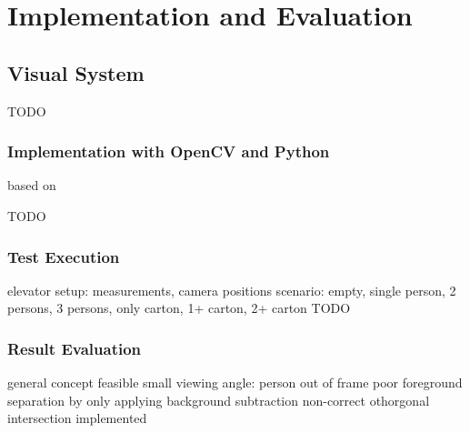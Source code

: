 \chapter{Implementation and Evaluation}
\label{chap:impl}


\section{Visual System}
TODO
\subsection{Implementation with OpenCV and Python}

based on \autocite[][]{xocoatzin2013voxelcarving}

TODO
\subsection{Test Execution}
elevator setup: measurements, camera positions
scenario: empty, single person, 2 persons, 3 persons, only carton, 1+ carton, 2+ carton
TODO
\subsection{Result Evaluation}
general concept feasible
small viewing angle: person out of frame
poor foreground separation by only applying background subtraction
non-correct othorgonal intersection implemented

